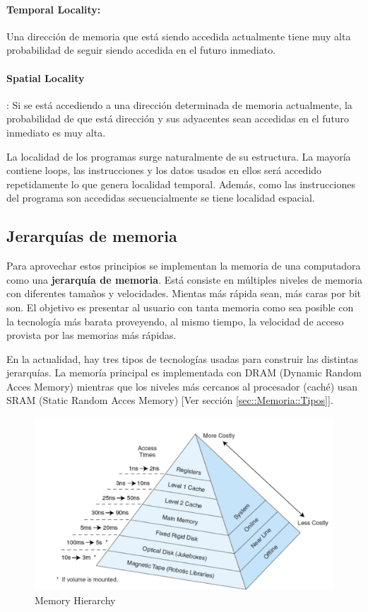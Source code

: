 \paragraph{Temporal Locality:} Una dirección de memoria que está siendo accedida actualmente tiene muy alta probabilidad de seguir siendo accedida en el futuro inmediato.

\paragraph{Spatial Locality}: Si se está accediendo a una dirección determinada de memoria actualmente, la probabilidad de que está dirección y sus adyacentes sean accedidas en el futuro inmediato es muy alta.

La localidad de los programas surge naturalmente de su estructura. La mayoría contiene loops, las instrucciones y los datos usados en ellos será accedido repetidamente lo que genera localidad temporal. Además, como las instrucciones del programa son accedidas secuencialmente se tiene localidad espacial.

\subsection{Jerarquías de memoria}
Para aprovechar estos principios se implementan la memoria de una computadora como una \textbf{jerarquía de memoria}. Está consiste en múltiples niveles de memoria con diferentes tamaños y velocidades. Mientas más rápida sean, más caras por bit son. El objetivo es presentar al usuario con tanta memoria como sea posible con la tecnología más barata proveyendo, al mismo tiempo, la velocidad de acceso provista por las memorias más rápidas.

En la actualidad, hay tres tipos de tecnologías usadas para construir las distintas jerarquías. La memoría principal es implementada con DRAM (Dynamic Random Acces Memory) mientras que los niveles más cercanos al procesador (caché) usan SRAM (Static Random Acces Memory)  [Ver sección \ref{sec::Memoria::Tipos}].

\begin{figure}[ht]
	\centering
	\includegraphics[width=1\textwidth]{imagenes/memory-heriarchy}
	\caption{Memory Hierarchy}
	\label{fig:memory-hierarchy}
\end{figure}

